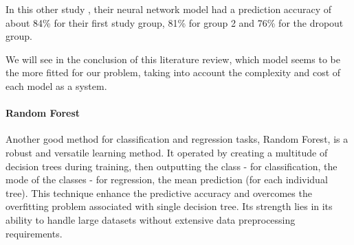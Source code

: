 In this other study \cite{siri_predicting_2015}, their neural network model had a prediction accuracy of about 84\% for their first study group, 81\% for group 2 and 76\% for the dropout group. 

We will see in the conclusion of this literature review, which model seems to be the more fitted for our problem, taking into account the complexity and cost of each model as a system.
\vspace{8pt}


\paragraph{Random Forest}
Another good method for classification and regression tasks, Random Forest, is a robust and versatile learning method. It operated by creating a multitude of decision trees during training, then outputting the class - for classification, the mode of the classes - for regression, the mean prediction (for each individual tree).
This technique enhance the predictive accuracy and overcomes the overfitting problem associated with single decision tree.
Its strength lies in its ability to handle large datasets without extensive data preprocessing requirements. 

